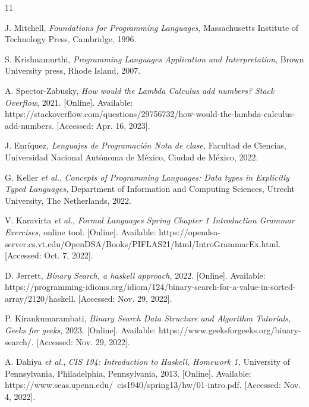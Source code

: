\begin{thebibliography}{11}
    
    \label{sec:9}
    \hypertarget{9}{}
    J. Mitchell, \textit{Foundations for Programming Languages}, Massachusetts Institute of Technology Press, Cambridge, 1996.
    
    
    \label{sec:10}
    \hypertarget{10}{}
    S. Krishnamurthi, \textit{Programming Languages Application and Interpretation}, Brown University press, Rhode Island, 2007.

    
    \label{sec:11}
    \hypertarget{11}{}
    A. Spector-Zabusky, \textit{How would the Lambda Calculus add numbers? }\textit{Stack Overflow}, 2021. [Online]. Available: https://stackoverflow.com/questions/29756732/how-would-the-lambda-calculus-add-numbers. [Accessed: Apr. 16, 2023].


    \label{sec:12}
    \hypertarget{12}{}
    J. Enríquez, \textit{Lenguajes de Programación Nota de clase, }Facultad de Ciencias, Universidad Nacional Autónoma de México, Ciudad de México, 2022.

    
    \label{sec:13}
    \hypertarget{13}{}
    G. Keller \textit{et al.}, \textit{Concepts of Programming Languages: Data types in Explicitly Typed Languages, }Department of Information and Computing Sciences, Utrecht University, The Netherlands, 2022.


    \label{sec:14}
    \hypertarget{14}{}
    V. Karavirta \textit{et al.}, \textit{Formal Languages Spring Chapter 1 Introduction Grammar Exercises, }online tool. [Online]. Available: https://opendsa-server.cs.vt.edu/OpenDSA/Books/PIFLAS21/html/IntroGrammarEx.html. [Accessed: Oct. 7, 2022].

    \label{sec:15}
    \hypertarget{15}{}
    D. Jerrett, \textit{Binary Search, a haskell approach, }2022. [Online]. Available: https://programming-idioms.org/idiom/124/binary-search-for-a-value-in-sorted-array/2120/haskell. [Accessed: Nov. 29, 2022].

    \label{sec:16}
    \hypertarget{16}{}
    P. Kirankumarambati, \textit{Binary Search Data Structure and Algorithm Tutorials, }\textit{Geeks for geeks}, 2023. [Online]. Available: https://www.geeksforgeeks.org/binary-search/. [Accessed: Nov. 29, 2022].

    \label{sec:17}
    \hypertarget{17}{}
    A. Dahiya \textit{et al.}, \textit{CIS 194: Introduction to Haskell, Homework 1, }University of Pennsylvania, Philadelphia, Pennsylvania, 2013. [Online]. Available: https://www.seas.upenn.edu/~cis1940/spring13/hw/01-intro.pdf. [Accessed: Nov. 4, 2022].


\end{thebibliography}
